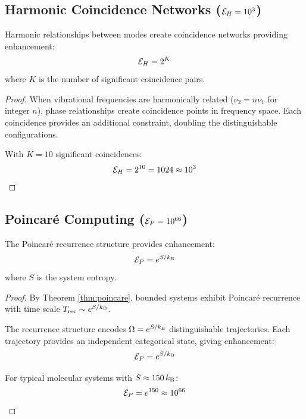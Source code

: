 \subsection{Harmonic Coincidence Networks ($\mathcal{E}_H = 10^{3}$)}

\begin{theorem}
\label{thm:harmonic}
Harmonic relationships between modes create coincidence networks providing enhancement:
\begin{equation}
\mathcal{E}_H = 2^K
\end{equation}
where $K$ is the number of significant coincidence pairs.
\end{theorem}

\begin{proof}
When vibrational frequencies are harmonically related ($\nu_2 = n \nu_1$ for integer $n$), phase relationships create coincidence points in frequency space. Each coincidence provides an additional constraint, doubling the distinguishable configurations.

With $K = 10$ significant coincidences:
\begin{equation}
\mathcal{E}_H = 2^{10} = 1024 \approx 10^3
\end{equation}
\end{proof}

\subsection{Poincar\'{e} Computing ($\mathcal{E}_P = 10^{66}$)}

\begin{theorem}
\label{thm:poincare_enhancement}
The Poincar\'{e} recurrence structure provides enhancement:
\begin{equation}
\mathcal{E}_P = e^{S/k_{\mathrm{B}}}
\end{equation}
where $S$ is the system entropy.
\end{theorem}

\begin{proof}
By Theorem \ref{thm:poincare}, bounded systems exhibit Poincar\'{e} recurrence with time scale $T_{\text{rec}} \sim e^{S/k_{\mathrm{B}}}$.

The recurrence structure encodes $\Omega = e^{S/k_{\mathrm{B}}}$ distinguishable trajectories. Each trajectory provides an independent categorical state, giving enhancement:
\begin{equation}
\mathcal{E}_P = e^{S/k_{\mathrm{B}}}
\end{equation}

For typical molecular systems with $S \approx 150 \, k_{\mathrm{B}}$:
\begin{equation}
\mathcal{E}_P = e^{150} \approx 10^{66}
\end{equation}
\end{proof}

